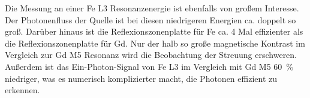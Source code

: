 \noindent
Die Messung an einer Fe L3 Resonanzenergie ist ebenfalls von großem Interesse. Der Photonenfluss der Quelle ist bei diesen niedrigeren Energien ca. doppelt so groß. Darüber hinaus ist die Reflexionszonenplatte für Fe ca. 4 Mal effizienter als die Reflexionszonenplatte für Gd. Nur der halb so große magnetische Kontrast im Vergleich zur Gd M5 Resonanz wird die Beobachtung der Streuung erschweren. Außerdem ist das Ein-Photon-Signal von Fe L3 im Vergleich mit Gd M5 \SI{60}{\percent} niedriger, was es numerisch komplizierter macht, die Photonen effizient zu erkennen.  




%     
